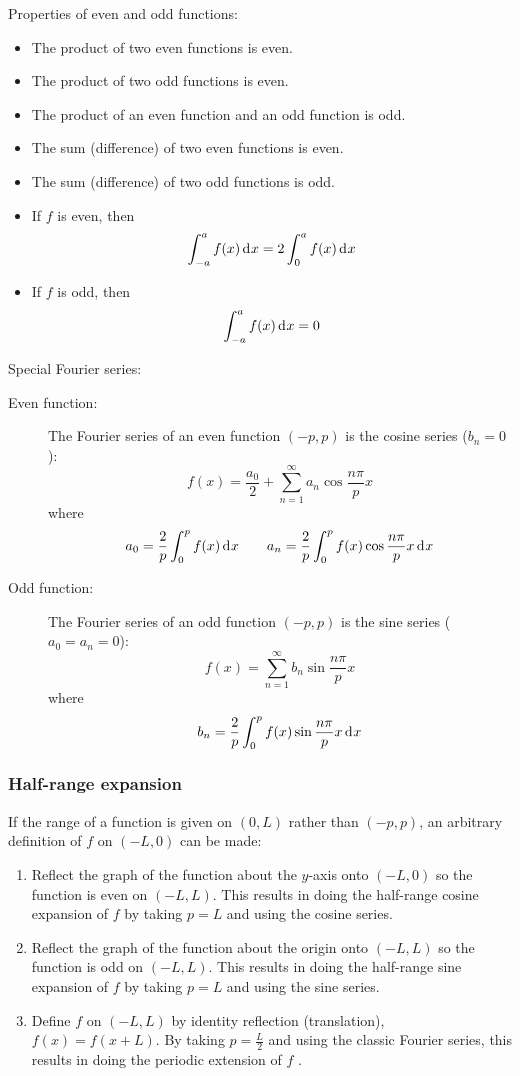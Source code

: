 \documentclass[10pt, twocolumn]{article}
\begin{document}
Properties of even and odd functions:
\begin{itemize}
  \item The product of two even functions is even.
  \item The product of two odd functions is even.
  \item The product of an even function and an odd function is odd.
  \item The sum (difference) of two even functions is even.
  \item The sum (difference) of two odd functions is odd.
  \item If \(f\) is even, then
        \[
          \int_{-a}^a{f(x) \,\mathrm{d}^{} x} = 2 \int_0^a{f(x) \,\mathrm{d}^{} x}
        \]
  \item If \(f\) is odd, then
        \[
          \int_{-a}^a{f(x) \,\mathrm{d}^{} x} = 0
        \]
\end{itemize}

Special Fourier series:
\begin{description}
  \item[Even function:] The Fourier series of an even function \((-p, p)\) is the cosine series (\(b_n = 0\)):
        \[
          f(x) = \frac{a_0}{2} + \sum_{n = 1}^\infty{a_n \cos{\frac{n \pi}{p}x}}
        \]
        where
        \[
          a_0 = \frac{2}{p} \int_0 ^p{f(x) \,\mathrm{d}^{} x}
          \qquad a_n = \frac{2}{p} \int_0 ^p{f(x) \cos{\frac{n \pi}{p}x} \,\mathrm{d}^{} x}
        \]
  \item[Odd function:] The Fourier series of an odd function \((-p, p)\) is the sine series (\(a_0 = a_n = 0\)):
        \[
          f(x) = \sum_{n = 1}^\infty {b_n \sin{\frac{n \pi}{p} x}}
        \]
        where
        \[
          b_n = \frac{2}{p} \int_0 ^p{f(x) \sin{\frac{n \pi}{p} x} \,\mathrm{d}^{} x}
        \]
\end{description}


\subsubsection{Half-range expansion}
If the range of a function is given on \((0, L)\) rather than \((-p,p)\), an arbitrary definition of \(f\) on \((-L, 0)\) can be made:
\begin{enumerate}
  \item Reflect the graph of the function about the \(y\)-axis onto \((-L, 0)\) so the function is even on \((-L, L)\).
        This results in doing the half-range cosine expansion of \(f\) by taking \(p = L\) and using the cosine series.
  \item Reflect the graph of the function about the origin onto \((-L, L)\) so the function is odd on \((-L, L)\).
        This results in doing the half-range sine expansion of \(f\) by taking \(p = L\) and using the sine series.
  \item Define \(f\) on \((-L, L)\) by identity reflection (translation), \(f(x) = f(x + L)\).
        By taking \(p = \frac{L}{2}\) and using the classic Fourier series, this results in doing the periodic extension of \(f\) .
\end{enumerate}
\end{document}
